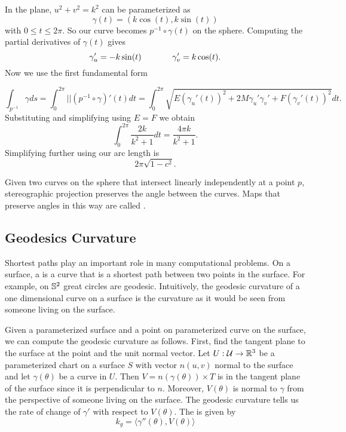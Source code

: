 \begin{example}
In the plane, $u^2+v^2=k^2$ can be parameterized
as $$\gamma(t)=(k\cos(t),k\sin(t))$$ with $0\leq t\leq 2\pi.$
So our curve becomes $p^{-1}\circ \gamma(t)$ on the sphere.
Computing the partial derivatives of $\gamma(t)$ gives
$$\gamma_u'=-k\sin(t)\hspace{1.3cm}  \gamma_v'=k\cos(t).$$
Now we use the first fundamental form

$$\int_{p^{-1}}\gamma ds=\int_{0}^{2\pi} ||(p^{-1}\circ \gamma)'(t)dt=\int_0^{2\pi}\sqrt{E(\gamma_u'(t))^2+2M\gamma_u'\gamma_v'+
F(\gamma_v'(t))^2}dt.$$
Substituting and simplifying using $E=F$ we obtain
$$\int_0^{2\pi}\frac{2k}{k^2+1}dt=\frac{4\pi k}{k^2+1}.$$
Simplifying further using   our arc length is
$$2\pi\sqrt{1-c^2}.$$

\end{example}



Given two curves on the sphere that intersect linearly independently at a point $p$, 
stereographic projection preserves the angle between the curves.
Maps that preserve angles in this way are called .

\subsection{Geodesics Curvature}

Shortest paths play an important role in many computational problems.
On a surface, a  is a curve that is a shortest path
between two points in the surface. 
For example, on $\mathbb{S}^2$ great circles are geodesic.
Intuitively, the geodesic curvature of a one dimensional curve on a surface
is the curvature as it would be seen from someone living on the surface.


Given a parameterized surface and a point on parameterized curve on the surface,
we can compute the geodesic curvature as follows.
First, find the tangent plane to the surface at the point and the unit normal vector.
Let $U:\mathcal{U}\to \mathbb{R}^3$ be a parameterized chart on a surface $S$ with vector $n(u,v)$ normal
to the surface
and let $\gamma(\theta)$ be a curve in $U$.
Then $V=n(\gamma(\theta))\times T$ is in the tangent plane of the surface since
it is perpendicular to $n$. Moreover, $V(\theta)$ is normal to $\gamma$ 
from the perspective of someone living on the surface. 
The geodesic curvature tells us the rate of change of $\gamma'$ with respect 
to $V(\theta)$.
The  is given by 
\begin{equation} \label{eqn:geodesic}
	k_g=\langle \gamma''(\theta),V(\theta)\rangle
\end{equation}

